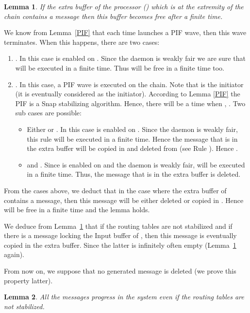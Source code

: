 \documentclass{llncs}
\renewenvironment{proof}{{\it Proof. } }{{\hfill }\vspace{.5pc}}
\newtheorem{lem}{Lemma}
\begin{document}
\begin{lem}\label{INTFree}
If the extra buffer of the processor  () which is at the extremity of the chain contains a message then
this buffer becomes free after a finite time.
\end{lem}  

\begin{proof}
We know from Lemma~\ref{PIF} that each time 
launches a PIF wave, then this wave terminates.  When this happens, there are two cases:
\begin{enumerate}
\item{}. In this case  is enabled on . Since the daemon is weakly fair we are sure that  will be executed in a finite time. Thus  will be free in a finite time too.
\item{}. In this case, a PIF wave is executed on the chain. Note that  is the initiator (it is eventually considered as the initiator). According to Lemma \ref{PIF} the PIF is a Snap stabilizing algorithm. Hence, there will be a time when , . Two sub cases are possible:
\begin{itemize}
\item\label{BINT}{Either  or }. In this case  is enabled on . Since the daemon is weakly fair, this rule will be executed in a finite time. Hence the message that is in the extra buffer will be copied in  and deleted from  (see Rule ). Hence .
\item{ and }. Since  is enabled on  and the daemon is weakly fair,  will be executed in a finite time. Thus, the message that is in the extra buffer is deleted.  
\end{itemize}
 \end{enumerate}
 
From the cases above, we deduct that in the case where the extra buffer of  contains a message, then this message will be either deleted or copied in . Hence   will be free in a finite time and the lemma holds.     
\end{proof}


 We deduce from Lemma~\ref{INTFree} that if the routing tables are not stabilized and if there is a message locking the
Input buffer of , then this message is eventually copied in the extra buffer.  Since the latter is infinitely
often empty (Lemma~\ref{INTFree} again). 

From now on, we suppose that no generated message is deleted (we prove this property latter).

\begin{lem}\label{DeadStable}
All the messages progress in the system even if the routing tables are not stabilized.
\end{lem}
\end{document}
